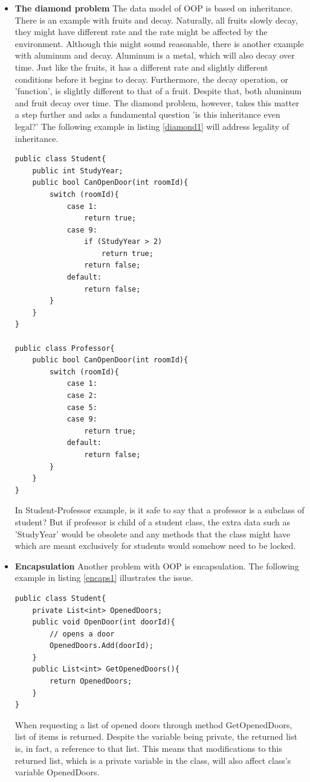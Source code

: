 \documentclass{article}
\begin{document}
\begin{itemize}
    \item \textbf{The diamond problem} \newline
        The data model of OOP is based on inheritance. There is an example with fruits and decay. Naturally, all fruits slowly decay, they might have different rate and the rate might be affected by the environment. Although this might sound reasonable, there is another example with aluminum and decay. Aluminum is a metal, which will also decay over time. Just like the fruits, it has a different rate and slightly different conditions before it begins to decay. Furthermore, the decay operation, or 'function', is slightly different to that of a fruit. Despite that, both aluminum and fruit decay over time.
        The diamond problem, however, takes this matter a step further and asks a fundamental question 'is this inheritance even legal?'
        The following example in listing \ref*{diamond1} will address legality of inheritance.
        \begin{lstlisting}[frame=single, label=diamond1, caption=Inheritance Problem]
public class Student{
    public int StudyYear;
    public bool CanOpenDoor(int roomId){
        switch (roomId){
            case 1:
                return true;
            case 9:
                if (StudyYear > 2)
                    return true;
                return false;
            default:
                return false;
        }
    }
}

public class Professor{
    public bool CanOpenDoor(int roomId){
        switch (roomId){
            case 1:
            case 2:
            case 5:
            case 9:
                return true;
            default:
                return false;
        }
    }
}
    \end{lstlisting}
          In Student-Professor example, is it safe to say that a professor is a subclass of student? But if professor is child of a student class, the extra data such as 'StudyYear' would be obsolete and any methods that the class might have which are meant exclusively for students would somehow need to be locked.
    \item \textbf{Encapsulation} \newline
          Another problem with OOP is encapsulation. The following example in listing \ref*{encaps1} illustrates the issue.
          \begin{lstlisting}[frame=single, label=encaps1, caption=Encapsulation Problem]
public class Student{
    private List<int> OpenedDoors;
    public void OpenDoor(int doorId){
        // opens a door
        OpenedDoors.Add(doorId);
    }
    public List<int> GetOpenedDoors(){
        return OpenedDoors;
    }
}
    \end{lstlisting}
          When requesting a list of opened doors through method GetOpenedDoors, list of items is returned. Despite the variable being private, the returned list is, in fact, a reference to that list. This means that modifications to this returned list, which is a private variable in the class, will also affect class's variable OpenedDoors.
\end{itemize}
\end{document}
